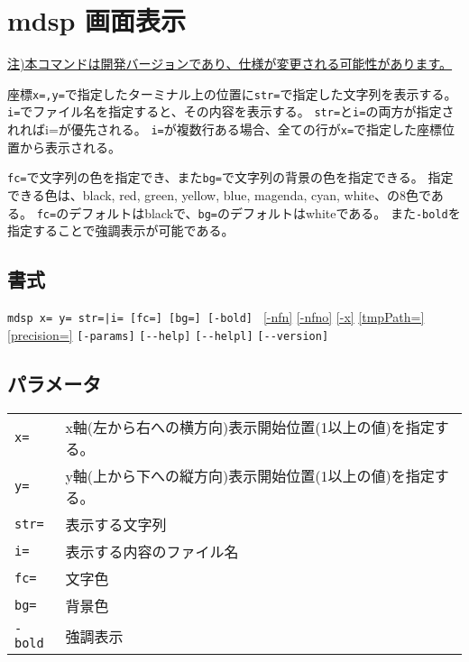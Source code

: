 
%

\section{mdsp 画面表示\label{sect:mdsp}}
\underline{注)本コマンドは開発バージョンであり、仕様が変更される可能性があります。}

座標\verb|x=,y=|で指定したターミナル上の位置に\verb|str=|で指定した文字列を表示する。
\verb|i=|でファイル名を指定すると、その内容を表示する。
\verb|str=|と\verb|i=|の両方が指定されればi=が優先される。
\verb|i=|が複数行ある場合、全ての行が\verb|x=|で指定した座標位置から表示される。

\verb|fc=|で文字列の色を指定でき、また\verb|bg=|で文字列の背景の色を指定できる。
指定できる色は、black, red, green, yellow, blue, magenda, cyan, white、の8色である。
\verb|fc=|のデフォルトはblackで、\verb|bg=|のデフォルトはwhiteである。
また\verb|-bold|を指定することで強調表示が可能である。

\subsection*{書式}
\verb/mdsp x= y= str=|i= [fc=] [bg=] [-bold] /
\hyperref[sect:option_nfn]{[-nfn]}
\hyperref[sect:option_nfno]{[-nfno]}
\hyperref[sect:option_x]{[-x]}
\hyperref[sect:option_option_tmppath]{[tmpPath=]}
\hyperref[sect:option_precision]{[precision=]}
\verb|[-params]|
\verb|[--help]|
\verb|[--helpl]|
\verb|[--version]|\\

\subsection*{パラメータ}
\begin{table}[htbp]
{\small
\begin{tabular}{ll}
\verb|x=|   & x軸(左から右への横方向)表示開始位置(1以上の値)を指定する。\\
\verb|y=|   & y軸(上から下への縦方向)表示開始位置(1以上の値)を指定する。\\
\verb|str=| & 表示する文字列 \\
\verb|i=|   & 表示する内容のファイル名 \\
\verb|fc=|  & 文字色\\
\verb|bg=|  & 背景色\\
\verb|-bold|& 強調表示\\
\end{tabular} 
}
\end{table} 


